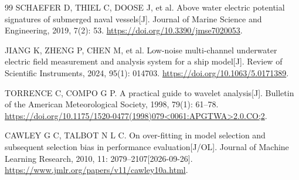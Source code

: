 \begin{thebibliography}{99}
SCHAEFER D, THIEL C, DOOSE J, et al.
Above water electric potential signatures of submerged naval vessels[J].
Journal of Marine Science and Engineering, 2019, 7(2): 53.
\url{https://doi.org/10.3390/jmse7020053}.

JIANG K, ZHENG P, CHEN M, et al.
Low-noise multi-channel underwater electric field measurement and analysis system for a ship model[J].
Review of Scientific Instruments, 2024, 95(1): 014703.
\url{https://doi.org/10.1063/5.0171389}.

TORRENCE C, COMPO G P.
A practical guide to wavelet analysis[J].
Bulletin of the American Meteorological Society, 1998, 79(1): 61--78.
\url{https://doi.org/10.1175/1520-0477(1998)079<0061:APGTWA>2.0.CO;2}.

CAWLEY G C, TALBOT N L C.
On over-fitting in model selection and subsequent selection bias in performance evaluation[J/OL].
Journal of Machine Learning Research, 2010, 11: 2079--2107[2026-09-26].
\url{https://www.jmlr.org/papers/v11/cawley10a.html}.

\end{thebibliography}
\endgroup

